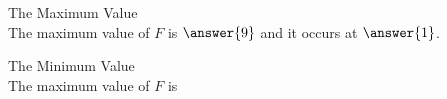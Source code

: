 \documentclass{ximera}
\begin{document}
\begin{exercise} The Maximum Value \\

The maximum value of $F$ is $\answer{9}$ and it occurs at $\answer{1}$.


\end{exercise}







\begin{exercise} The Minimum Value \\

The maximum value of $F$ is 


\begin{multipleChoice}
\end{multipleChoice}


\end{exercise}
\end{document}
